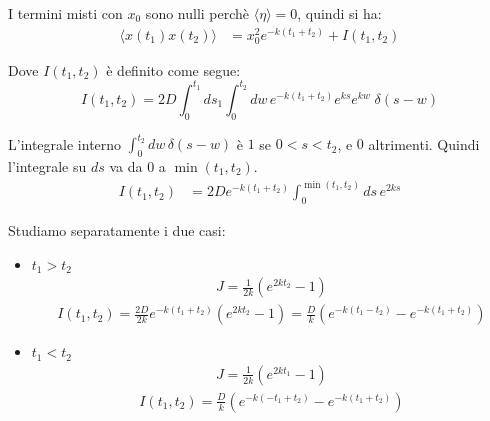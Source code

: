 I termini misti con $x_0$ sono nulli perchè $\langle\eta\rangle = 0$, quindi si ha:
\begin{equation}
\begin{aligned}
\langle x(t_1) x(t_2) \rangle &= x_0^2  e^{-k(t_1+t_2)} + I(t_1, t_2)
\end{aligned}
\end{equation}

Dove $I(t_1, t_2)$ è definito come segue:
\begin{equation} 
I(t_1, t_2)= 2D \int_0^{t_1} ds_1 \int_0^{t_2} dw \, e^{-k(t_1+t_2)} e^{k s} e^{k w} \; \delta(s-w) 
\end{equation}

L'integrale interno $\int_0^{t_2} dw \, \delta(s-w)$ è $1$ se $0 < s < t_2$, e $0$ altrimenti. Quindi l'integrale su $ds$ va da $0$ a $\min(t_1, t_2)$.
\begin{equation}
\begin{aligned}
I(t_1, t_2) &= 2D e^{-k(t_1+t_2)} \int_0^{\min(t_1, t_2)} ds \, e^{2k s}
\end{aligned}
\end{equation}

Studiamo separatamente i due casi:
\begin{itemize}
    \item $t_1>t_2$
\begin{equation}
\begin{aligned}
J=\frac{1}{2k} (e^{2k t_2} -1 )
\end{aligned}
\end{equation}
\begin{equation}
\begin{aligned}
I(t_1, t_2) = \frac{2D}{2k} e^{-k(t_1+t_2)} (e^{2k t_2} -1 )=\frac{D}{k}  (e^{-k(t_1-t_2)} - e^{-k( t_1+t_2)} )
\end{aligned}
\end{equation}

\item $t_1<t_2$
\begin{equation}
\begin{aligned}
J=\frac{1}{2k} (e^{2k t_1} -1 )
\end{aligned}
\end{equation}
\begin{equation}
\begin{aligned}
I(t_1, t_2) = \frac{D}{k}  (e^{-k(-t_1+t_2)} - e^{-k( t_1+t_2)}  )
\end{aligned}
\end{equation}
\end{itemize}

